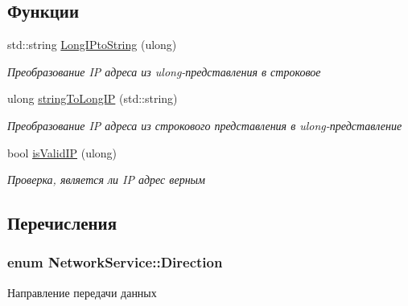 \subsection*{Функции}
\begin{DoxyCompactItemize}
\item 
std\+::string \hyperlink{namespace_network_service_a814602dad243fba31a6b60d5c56587ac}{Long\+I\+Pto\+String} (ulong)
\begin{DoxyCompactList}\small\item\em Преобразование I\+P адреса из ulong-\/представления в строковое \end{DoxyCompactList}\item 
ulong \hyperlink{namespace_network_service_a72263b9e1be1b1629b46daa243761ab9}{string\+To\+Long\+I\+P} (std\+::string)
\begin{DoxyCompactList}\small\item\em Преобразование I\+P адреса из строкового представления в ulong-\/представление \end{DoxyCompactList}\item 
bool \hyperlink{namespace_network_service_a4e78f6978578fd3ee62f1c3f8b555009}{is\+Valid\+I\+P} (ulong)
\begin{DoxyCompactList}\small\item\em Проверка, является ли I\+P адрес верным \end{DoxyCompactList}\end{DoxyCompactItemize}


\subsection{Перечисления}
\hypertarget{namespace_network_service_abe1196dad9e8afcbc5c6b38196ce2c65}{}
\subsubsection[{Direction}]{\setlength{\rightskip}{0pt plus 5cm}enum {\bf Network\+Service\+::\+Direction}}\label{namespace_network_service_abe1196dad9e8afcbc5c6b38196ce2c65}


Направление передачи данных 

